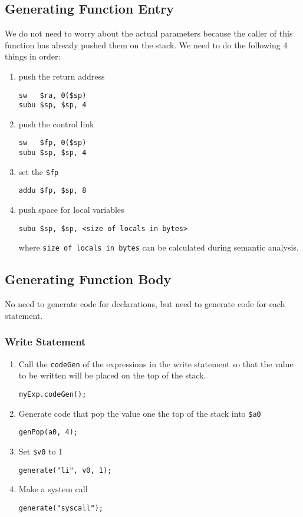 \documentclass[11pt]{article}
\begin{document}
\subsection{Generating Function Entry}
\label{sec:org9efbf5d}
We do not need to worry about the actual parameters because the caller of this function has
already pushed them on the stack.
We need to do the following 4 things in order:
\begin{enumerate}
\item push the return address
\begin{verbatim}
sw   $ra, 0($sp)
subu $sp, $sp, 4
\end{verbatim}
\item push the control link
\begin{verbatim}
sw   $fp, 0($sp)
subu $sp, $sp, 4
\end{verbatim}
\item set the \texttt{\$fp}
\begin{verbatim}
addu $fp, $sp, 8
\end{verbatim}
\item push space for local variables
\begin{verbatim}
subu $sp, $sp, <size of locals in bytes>
\end{verbatim}
where \texttt{size of locals in bytes} can be calculated during semantic analysis.
\end{enumerate}
\subsection{Generating Function Body}
\label{sec:orge0698c1}
No need to generate code for declarations, but need to generate code for each statement.
\subsubsection{Write Statement}
\label{sec:org14269ac}
\begin{enumerate}
\item Call the \texttt{codeGen} of the expressions in the write statement so that the value to be written
will be placed on the top of the stack.
\begin{verbatim}
myExp.codeGen();
\end{verbatim}
\item Generate code that pop the value one the top of the stack into \texttt{\$a0}
\begin{verbatim}
genPop(a0, 4);
\end{verbatim}
\item Set \texttt{\$v0} to 1
\begin{verbatim}
generate("li", v0, 1);
\end{verbatim}
\item Make a system call
\begin{verbatim}
generate("syscall");
\end{verbatim}
\end{enumerate}
\end{document}
